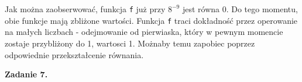 \documentclass[15pt, a4paper]{article}
\begin{document}
Jak można zaobserwować, funkcja \verb|f| już przy $8^{-9}$ jest równa 0. Do tego momentu, obie funkcje mają zbliżone wartości. Funkcja \verb|f| traci dokładność przez operowanie na małych liczbach - odejmowanie od pierwiaska, który w pewnym momencie zostaje przybliżony do 1, wartosci 1. Możnaby temu zapobiec poprzez odpowiednie przekształcenie równania.

\vspace{0.5cm}

\noindent\hrulefill


\vspace{0.5cm}

\noindent\textbf{Zadanie 7.} 
\end{document}
